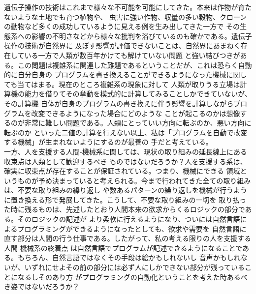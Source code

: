\documentclass[10pt,a4paper]{ltjsarticle}       %
\begin{document}
遺伝子操作の技術はこれまで様々な不可能を可能にしてきた。本来は作物が育たないような土地でも育つ植物や、
虫害に強い作物、収量の多い穀物、クローンの動物など多くの成功しているように見える例を生み出してきた一方で
その生態系への影響の不明さなどから様々な批判を浴びているのも確かである。遺伝子操作の技術が自然界に
及ぼす影響が評価できないことは、自然界にあまねく存在している一方で人類が数百年かけても解けていない問題
と強い結びつきがある。この問題は複雑系に関連した難題であるということだが、これは恐らく自動的に自分自身の
プログラムを書き換えることができるようになった機械に関しても当てはまる。現在のところ複雑系の現象に対して
人類が取りうる立場は計算機の能力を借りてその挙動を模式的に計算してみることしかできていないが、その計算機
自体が自身のプログラムの書き換えに伴う影響を計算しながらプログラムを改変できるようになった場合にどのような
ことが起こるのかは想像するのが非常に難しい問題である。人類にとっていい方向に転ぶのか、悪い方向に転ぶのか
といった二値の計算を行えない以上、私は「プログラムを自動で改変する機械」が生まれないようにするのが最善の
手だと考えている。\\

一方、人を支援する人間-機械系に関しては、現状の取り組みの延長線上にある収束点は人類として歓迎するべき
ものではないだろうか？人を支援する系は、確実に収束点が存在することが保証されている。つまり、機械にできる
領域というものが予め決まっていると考えられる。今まで行われてきた全ての取り組みは、不要な取り組みの繰り返し
や数あるパターンの繰り返しを機械が行うように置き換える形で発展してきた。こうして、不要な取り組みの一切を
取り払った時に残るものは、先述したとおり人間本来の欲求からくるロジックの部分である。そのロジックの記述が
より柔軟に行えるようになり、ついには自然言語によるプログラミングができるようになったとしても、欲求や需要を
自然言語に直す部分は人間の行う仕事である。したがって、私の考える限りの人を支援する人間-機械系の終着点
は自然言語でプログラムが記述できるようになることである。もちろん、自然言語ではなくその手段は絵かもしれないし
音声かもしれないが、いずれにせよその前の部分には必ず人にしかできない部分が残っていることになるしそのあり方
がプログラミングの自動化ということを考えた時あるべき姿ではないだろうか？


\end{document}
